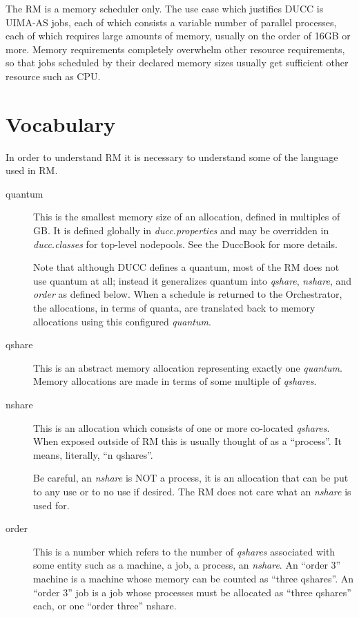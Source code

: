 The RM is a memory scheduler only.  The use case which justifies DUCC is UIMA-AS jobs, each of
which consists a variable number of parallel processes, each of which requires large amounts of memory, usually
on the order of 16GB or more.  Memory requirements completely overwhelm other resource
requirements, so that jobs scheduled by their declared memory sizes usually get sufficient
other resource such as CPU. 

\section{Vocabulary}
    In order to understand RM it is necessary to understand some of the language used in RM.

    \begin{description}
    \item[quantum] This is the smallest memory size of an allocation, defined in multiples of GB.  It
      is defined globally in {\em ducc.properties} and may be overridden in {\em ducc.classes} for
      top-level nodepools.  See the DuccBook for more details.
      
      Note that although DUCC defines a quantum, most of the RM does not
      use quantum at all; instead it generalizes quantum into {\em qshare}, {\em nshare},
      and {\em order} as defined below.  When a schedule is returned to the Orchestrator, the
      allocations, in terms of quanta, are translated back to memory allocations using this
      configured {\em quantum}.
      
    \item[qshare] This is an abstract memory allocation representing exactly one {\em quantum}.  Memory
      allocations are made in terms of some multiple of {\em qshares}.

    \item[nshare] This is an allocation which consists of one or more co-located {\em qshares}.  When 
      exposed outside of RM this is usually thought of as a ``process''.  It means, literally,
      ``n qshares''.  
      
        Be careful, an {\em nshare} is NOT a process, it is an allocation that can be put to
        any use or to no use if desired.  The RM does not care what an {\em nshare} is used for.

      \item[order] This is a number which refers to the number of {\em qshares} associated with some
        entity such as a machine, a job, a process, an {\em nshare}.  An ``order 3'' machine is a
        machine whose memory can be counted as ``three qshares''.  An ``order 3'' job is a job whose
        processes must be allocated as ``three qshares'' each, or one ``order three'' nshare.


\end{description}
